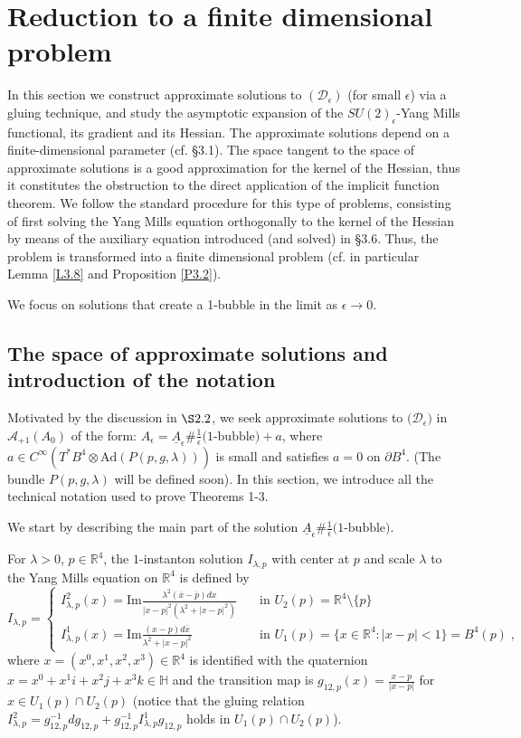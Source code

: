 \documentclass[11pt]{article}
\numberwithin{equation}{section} \setlength{\topmargin}{-35pt}
\newcommand{\R}{\mathbb{R}}
\begin{document}
\section{Reduction to a finite dimensional problem}
In this section we construct approximate solutions to
$(\mathcal{D}_\epsilon)$ (for small $\epsilon$) via a gluing
technique, and study the asymptotic expansion of the
$SU(2)_\epsilon$-Yang Mills functional, its gradient and its
Hessian. The approximate solutions depend on a finite-dimensional
parameter (cf. \S3.1). The space tangent to the space of approximate
solutions is a good approximation for the kernel of the Hessian,
thus it constitutes the obstruction to the direct application of the
implicit function theorem. We follow the standard procedure for this
type of problems, consisting of first solving the Yang Mills
equation orthogonally to the kernel of the Hessian by means of the
auxiliary equation introduced (and solved) in \S3.6. Thus, the
problem is transformed into a finite dimensional problem (cf. in
particular Lemma \ref{L3.8} and Proposition \ref{P3.2}).

\noindent We focus on solutions that create a 1-bubble in the limit
as $\epsilon\to 0.$
\subsection{The space of approximate solutions and introduction of the notation}
Motivated by the discussion in $\S 2.2$, we seek approximate
solutions to $\bigl(\mathcal{D}_{\epsilon}\bigr)$ in
$\mathcal{A}_{+1}(A_0)$ of the form:
$A_{\epsilon}=\underline{A}_{\epsilon}\#\frac{1}{\epsilon}\text{(1-bubble)}+a$,
where $a\in C^{\infty}(T^{\ast}B^4\otimes\text{Ad}(P(p,g,\lambda)))$
is small and satisfies $a=0$ on $\partial B^4$. (The bundle
$P(p,g,\lambda)$ will be defined soon). In this section, we
introduce all the technical notation used to prove Theorems 1-3.

We start by describing the main part of the solution
$\underline{A}_{\epsilon}\#\frac{1}{\epsilon}\text{(1-bubble)}$.

For $\lambda>0$, $p\in\R^4$, the $1$-instanton solution
$I_{\lambda,p}$ with center at $p$ and scale $\lambda$ to the Yang
Mills equation on $\R^4$
is defined by
$$I_{\lambda,p}=\left\{\begin{array}{ll}
I^2_{\lambda,p}(x)=\text{Im}\frac{\lambda^2(\overline{x}-\overline{p})dx}{|x-p|^2(\lambda^2+|x-p|^2)} &\quad\mbox{in }U_2(p)=\R^4\setminus\{p\}\\
I^1_{\lambda,p}(x)=\text{Im}\frac{(x-p)d\overline{x}}{\lambda^2+|x-p|^2}
&\quad\mbox{in } U_1(p)=\{x\in\R^4:|x-p|<1\}=B^4 (p)\;,
\end{array}\right .$$
where $x=(x^0,x^1,x^2,x^3)\in\R^4$ is identified with the quaternion
$x=x^0+x^1i+x^2j+x^3k\in\mathbb{H}$ and the transition map is
$g_{12,p}(x)=\frac{x-p}{|x-p|}$ for $x\in U_1(p)\cap U_2(p)$ (notice
that the gluing relation
$I^2_{\lambda,p}=g_{12,p}^{-1}dg_{12,p}+g_{12,p}^{-1}I_{\lambda,p}^1g_{12,p}$
holds in $U_1(p)\cap U_2(p)$).
\end{document}
